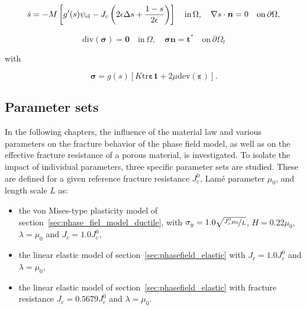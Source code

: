 \documentclass[pdflatex,sn-mathphys-num]{sn-jnl}%
\theoremstyle{thmstyleone}%
\theoremstyle{thmstyletwo}%
\theoremstyle{thmstylethree}%
\begin{document}
\begin{equation}
    \dot{s} = -M \left[g'(s)\psi_{\rm{el}}  - J_c\left(2\epsilon\Delta{s} + \dfrac{1-s}{2\epsilon}\right)\right] \quad \text{in} \, \Omega, \quad \nabla{s}\cdot{\boldsymbol{n}} = 0\quad\text{on}\,\partial\Omega,
    \label{eq:evolution_s_elastic}
\end{equation}

\begin{equation}
    \text{div}(\boldsymbol{\sigma}) = \boldsymbol{0} \quad \text{in} \, \Omega, \quad{\boldsymbol{\sigma} \boldsymbol{n} =\boldsymbol{t}^*} \quad\text{on}\,\partial\Omega_t
    \label{eq:equilibrium_elastic}
\end{equation}

with 

\begin{equation}
    \boldsymbol{\sigma} = g(s)\left[K \text{tr}\boldsymbol{\varepsilon}\boldsymbol{1} + 2\mu\text{dev}(\boldsymbol{\varepsilon})\right].
\end{equation}



\subsection{Parameter sets}
\label{sec:parameter_sets}
In the following chapters, the influence of the material law and various parameters on the fracture behavior of the phase field model,
as well as on the effective fracture resistance of a porous material, is investigated.
To isolate the impact of individual parameters, three specific parameter sets are studied.
These are defined for a given reference fracture resistance $J_c^0$, Lam\'{e} parameter $\mu_0$, and length scale $L$ as: 
\begin{itemize}
\setlength{\itemindent}{4em}


\item[\textbf{vM}:]
\parbox[t]{\dimexpr\linewidth-4em\relax}{
the von Mises-type plasticity model of section~\ref{sec:phase_fiel_model_ductile},
with $\sigma_y=1.0\sqrt{\nicefrac{J_c^0\mu_0}{L}}$, $H=0.22\mu_0$,
$\lambda=\mu_0$ and $J_c=1.0J_c^0$,
}

\item[\textbf{Eq$\boldsymbol{J_c}$}:]
\parbox[t]{\dimexpr\linewidth-4em\relax}{
the linear elastic model of section~\ref{sec:phasefield_elastic}
with $J_c=1.0J_c^0$ and $\lambda=\mu_0$,
}

\item[\textbf{Eq$\boldsymbol{\sigma^*}$}:]
\parbox[t]{\dimexpr\linewidth-4em\relax}{
the linear elastic model of section~\ref{sec:phasefield_elastic}
with fracture resistance $J_c=0.5679J_c^0$ and $\lambda=\mu_0$.
}
\end{itemize}
\end{document}
